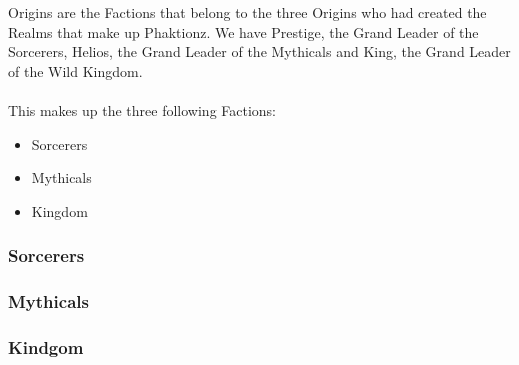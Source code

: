 Origins are the Factions that belong to the three Origins who had created the Realms 
that make up Phaktionz. We have Prestige, the Grand Leader of the Sorcerers, Helios,
the Grand Leader of the Mythicals and King, the Grand Leader of the Wild Kingdom. 
\\\\
This makes up the three following Factions: 
\begin{itemize}
    \item Sorcerers
    \item Mythicals
    \item Kingdom 
\end{itemize}

\subsubsection{Sorcerers}


\subsubsection{Mythicals}


\subsubsection{Kindgom}
